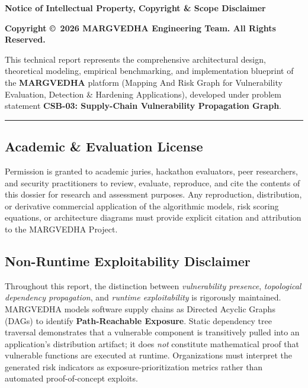 \documentclass[12pt,a4paper,oneside]{report}
\begin{document}
\clearpage
\thispagestyle{plain}
\vspace*{1cm}

\begin{center}
    {\Large \textbf{Notice of Intellectual Property, Copyright \& Scope Disclaimer}}
\end{center}
\vspace{0.8cm}

\textbf{Copyright \copyright\ 2026 MARGVEDHA Engineering Team. All Rights Reserved.}

This technical report represents the comprehensive architectural design, theoretical modeling, empirical benchmarking, and implementation blueprint of the \textbf{MARGVEDHA} platform (Mapping And Risk Graph for Vulnerability Evaluation, Detection \& Hardening Applications), developed under problem statement \textbf{CSB-03: Supply-Chain Vulnerability Propagation Graph}.

\vspace{0.5cm}
\noindent\rule{\linewidth}{0.4pt}
\vspace{0.5cm}

\subsection*{Academic \& Evaluation License}
Permission is granted to academic juries, hackathon evaluators, peer researchers, and security practitioners to review, evaluate, reproduce, and cite the contents of this dossier for research and assessment purposes. Any reproduction, distribution, or derivative commercial application of the algorithmic models, risk scoring equations, or architecture diagrams must provide explicit citation and attribution to the MARGVEDHA Project.

\subsection*{Non-Runtime Exploitability Disclaimer}
Throughout this report, the distinction between \textit{vulnerability presence}, \textit{topological dependency propagation}, and \textit{runtime exploitability} is rigorously maintained. MARGVEDHA models software supply chains as Directed Acyclic Graphs (DAGs) to identify \textbf{Path-Reachable Exposure}. Static dependency tree traversal demonstrates that a vulnerable component is transitively pulled into an application's distribution artifact; it does \textit{not} constitute mathematical proof that vulnerable functions are executed at runtime. Organizations must interpret the generated risk indicators as exposure-prioritization metrics rather than automated proof-of-concept exploits.
\end{document}
